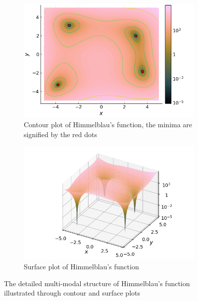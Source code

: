   \begin{figure}[ht!]
    \centering
    \begin{subfigure}[b]{0.45\textwidth}
      \centering
      \includegraphics[width=\textwidth]
        {img/test_functions/himmelblau_contour.png}
      \caption{
        Contour plot of Himmelblau's function, the minima are signified by the 
        red dots
      }
      \label{fig:app:test:himmelblau:contour}
    \end{subfigure}
    \hfill
    \begin{subfigure}[b]{0.45\textwidth}
      \centering
      \includegraphics[width=\textwidth]
        {img/test_functions/himmelblau_surface.png}
      \caption{Surface plot of Himmelblau's function}
      \label{fig:app:test:himmelblau:surface}
    \end{subfigure}
    \caption{
      The detailed multi-modal structure of Himmelblau's function illustrated 
      through contour and surface plots
    }
    \label{fig:app:test:himmelblau}
  \end{figure}
